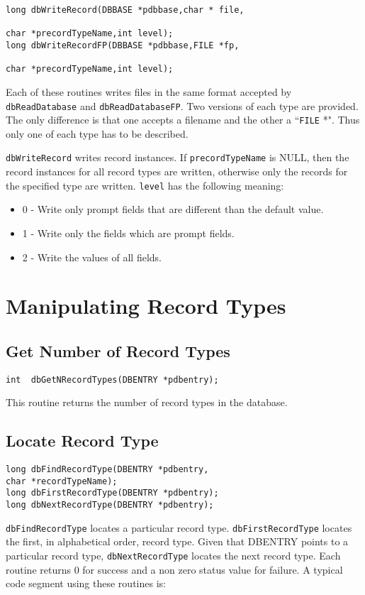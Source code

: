 \begin{verbatim}long dbWriteRecord(DBBASE *pdbbase,char * file,

char *precordTypeName,int level);
long dbWriteRecordFP(DBBASE *pdbbase,FILE *fp,

char *precordTypeName,int level);
\end{verbatim}
Each of these routines writes files in the same format accepted by \verb|dbReadDatabase| and \verb|dbReadDatabaseFP|. Two 
versions of each type are provided. The only difference is that one accepts a filename and the other a ``\verb|FILE| *". Thus only 
one of each type has to be described.

\verb|dbWriteRecord| writes record instances. If \verb|precordTypeName| is NULL, then the record instances for all record 
types are written, otherwise only the records for the specified type are written. \verb|level| has the following meaning:

\begin{itemize}\item 0 - Write only prompt fields that are different than the default value.

\item 1 - Write only the fields which are prompt fields.

\item 2 - Write the values of all fields.

\end{itemize}\section{Manipulating Record Types}

\subsection{Get Number of Record Types}

\begin{verbatim}int  dbGetNRecordTypes(DBENTRY *pdbentry);
\end{verbatim}This routine returns the number of record types in the database.

\subsection{Locate Record Type}

\begin{verbatim}long dbFindRecordType(DBENTRY *pdbentry,
char *recordTypeName);
long dbFirstRecordType(DBENTRY *pdbentry);
long dbNextRecordType(DBENTRY *pdbentry);
\end{verbatim}
\verb|dbFindRecordType| locates a particular record type. \verb|dbFirstRecordType| locates the first, in alphabetical order, 
record type. Given that DBENTRY points to a particular record type, \verb|dbNextRecordType| locates the next record type. 
Each routine returns 0 for success and a non zero status value for failure. A typical code segment using these routines is:

